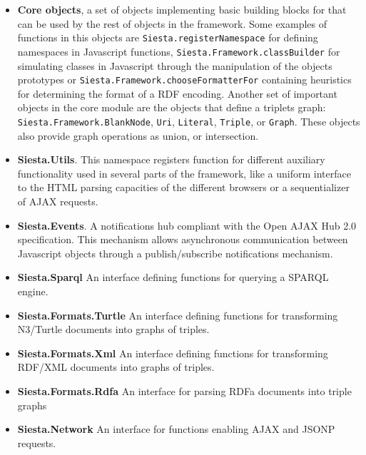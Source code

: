\begin{itemize}
\item \textbf{Core objects}, a set of objects implementing basic building blocks for that can be used by the rest of objects in
  the framework. Some examples of functions in this objects are \texttt{Siesta.registerNamespace} for defining
  namespaces in Javascript functions, \texttt{Siesta.Framework.classBuilder} for simulating classes in Javascript
  through the manipulation of the objects prototypes or \texttt{Siesta.Framework.chooseFormatterFor} containing
  heuristics for determining the format of a RDF encoding. Another set of important objects in the core module are the objects
  that define a triplets graph: \texttt{Siesta.Framework.BlankNode}, \texttt{Uri}, \texttt{Literal}, \texttt{Triple}, or
  \texttt{Graph}. These objects also provide graph operations as union, or intersection.
\item \textbf{Siesta.Utils}. This namespace registers function for different auxiliary functionality used in several
  parts of the framework, like a uniform interface to the HTML parsing capacities of the different browsers or a
  sequentializer of AJAX requests.
\item \textbf{Siesta.Events}. A notifications hub compliant with the Open AJAX Hub 2.0 specification. This mechanism
  allows asynchronous communication between Javascript objects through a publish/subscribe notifications mechanism.
\item \textbf{Siesta.Sparql} An interface defining functions for querying a SPARQL engine.
\item \textbf{Siesta.Formats.Turtle} An interface defining functions for transforming N3/Turtle documents into graphs
  of triples.
\item \textbf{Siesta.Formats.Xml} An interface defining functions for transforming RDF/XML documents into graphs of
  triples.
\item \textbf{Siesta.Formats.Rdfa} An interface for parsing RDFa documents into triple graphs
\item \textbf{Siesta.Network} An interface for functions enabling AJAX and JSONP requests.
\end{itemize}


